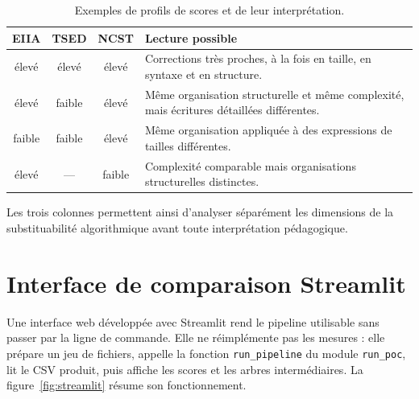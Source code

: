 {\begin{table}[htbp]
\centering
\small
\renewcommand{\arraystretch}{1.2}
\begin{tabularx}{\textwidth}{cccX}
\toprule
\textcolor{eiiacol}{\textbf{EIIA}} & \textcolor{tsedcol}{\textbf{TSED}} &
\textcolor{ncstcol}{\textbf{NCST}} & \textbf{Lecture possible} \\
\midrule
élevé & élevé & élevé & Corrections très proches, à la fois en taille, en syntaxe et en structure. \\
élevé & faible & élevé & Même organisation structurelle et même complexité, mais écritures détaillées différentes. \\
faible & faible & élevé & Même organisation appliquée à des expressions de tailles différentes. \\
élevé & --- & faible & Complexité comparable mais organisations structurelles distinctes. \\
\bottomrule
\end{tabularx}
\caption{Exemples de profils de scores et de leur interprétation.}
\label{tab:profils}
\end{table}

Les trois colonnes permettent ainsi d'analyser séparément les dimensions de la
substituabilité algorithmique avant toute interprétation pédagogique.

\section{Interface de comparaison Streamlit}

Une interface web développée avec Streamlit rend le pipeline utilisable sans
passer par la ligne de commande. Elle ne réimplémente pas les mesures : elle
prépare un jeu de fichiers, appelle la fonction \texttt{run\_pipeline} du
module \texttt{run\_poc}, lit le CSV produit, puis affiche les scores et les
arbres intermédiaires. La figure~\ref{fig:streamlit} résume son
fonctionnement.

\begin{figure}[htbp]
\centering
{}%
\end{figure}}
